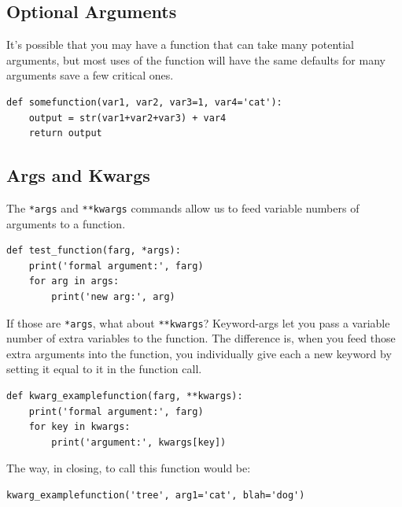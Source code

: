 \subsection{Optional Arguments} %
It's possible that you may have a function that can take many potential arguments, but most uses of the function will have the same defaults for many arguments save a few critical ones. %

\begin{lstlisting}
def somefunction(var1, var2, var3=1, var4='cat'):
    output = str(var1+var2+var3) + var4
    return output
\end{lstlisting} %

\subsection{Args and Kwargs} %
The \texttt{*args} and \texttt{**kwargs} commands allow us to feed variable numbers of arguments to a function. %

\begin{lstlisting}
def test_function(farg, *args):
    print('formal argument:', farg)
    for arg in args:
        print('new arg:', arg)
\end{lstlisting} %

If those are \texttt{*args}, what about \texttt{**kwargs}? %
Keyword-args let you pass a variable number of extra variables to the function. %
The difference is, when you feed those extra arguments into the function, you individually give each a new keyword by setting it equal to it in the function call. %

\begin{lstlisting}
def kwarg_examplefunction(farg, **kwargs):
    print('formal argument:', farg)
    for key in kwargs:
        print('argument:', kwargs[key])
\end{lstlisting} %

The way, in closing, to call this function would be: %

\begin{lstlisting}
kwarg_examplefunction('tree', arg1='cat', blah='dog')
\end{lstlisting} %
